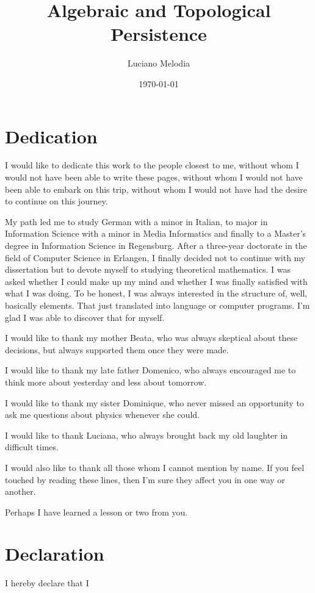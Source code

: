 \documentclass[b5paper, 11pt, twoside]{report}
\title{Algebraic and Topological Persistence}
\author{Luciano Melodia}
\date{\today}
\begin{document}



\chapter*{Dedication}

I would like to dedicate this work to the people closest to me, without whom I would not have been able to write these pages, without whom I would not have been able to embark on this trip, without whom I would not have had the desire to continue on this journey.

My path led me to study German with a minor in Italian, to major in Information Science with a minor in Media Informatics and finally to a Master's degree in Information Science in Regensburg. After a three-year doctorate in the field of Computer Science in Erlangen, I finally decided not to continue with my dissertation but to devote myself to studying theoretical mathematics. I was asked whether I could make up my mind and whether I was finally satisfied with what I was doing. To be honest, I was always interested in the structure of, well, basically elements. That just translated into language or computer programs. I'm glad I was able to discover that for myself.

I would like to thank my mother Beata, who was always skeptical about these decisions, but always supported them once they were made.

I would like to thank my late father Domenico, who always encouraged me to think more about yesterday and less about tomorrow.

I would like to thank my sister Dominique, who never missed an opportunity to ask me questions about physics whenever she could.

I would like to thank Luciana, who always brought back my old laughter in difficult times.

I would also like to thank all those whom I cannot mention by name.
If you feel touched by reading these lines, then I'm sure they affect you in one way or another.

Perhaps I have learned a lesson or two from you.

\chapter*{Declaration}

I hereby declare that I
\end{document}
